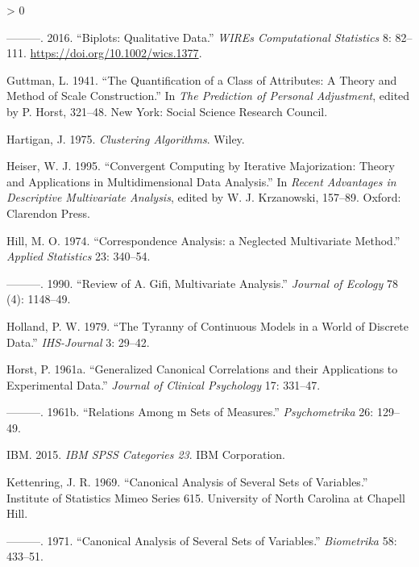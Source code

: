 \documentclass[
  12pt,
]{book}
\newlength{\cslhangindent}
\newenvironment{CSLReferences}[2] %
 {%
  \setlength{\parindent}{0pt}
  \ifodd #1 \everypar{\setlength{\hangindent}{\cslhangindent}}\ignorespaces\fi
  \ifnum #2 > 0
  \setlength{\parskip}{#2\baselineskip}
  \fi
 }%
 {}
\begin{document}
\begin{CSLReferences}{1}{0}
\leavevmode\hypertarget{ref-gower_leroux_gardnerlubbe_16}{}%
---------. 2016. {``{Biplots: Qualitative Data}.''} \emph{WIREs Computational Statistics} 8: 82--111. \url{https://doi.org/10.1002/wics.1377}.

\leavevmode\hypertarget{ref-guttman_41}{}%
Guttman, L. 1941. {``{The Quantification of a Class of Attributes: A Theory and Method of Scale Construction}.''} In \emph{The Prediction of Personal Adjustment}, edited by P. Horst, 321--48. New York: Social Science Research Council.

\leavevmode\hypertarget{ref-hartigan_75}{}%
Hartigan, J. 1975. \emph{Clustering Algorithms}. Wiley.

\leavevmode\hypertarget{ref-heiser_95}{}%
Heiser, W. J. 1995. {``{Convergent Computing by Iterative Majorization: Theory and Applications in Multidimensional Data Analysis}.''} In \emph{Recent Advantages in Descriptive Multivariate Analysis}, edited by W. J. Krzanowski, 157--89. Oxford: Clarendon Press.

\leavevmode\hypertarget{ref-hill_74}{}%
Hill, M. O. 1974. {``{Correspondence Analysis: a Neglected Multivariate Method}.''} \emph{Applied Statistics} 23: 340--54.

\leavevmode\hypertarget{ref-hill_90}{}%
---------. 1990. {``{Review of A. Gifi, Multivariate Analysis}.''} \emph{Journal of Ecology} 78 (4): 1148--49.

\leavevmode\hypertarget{ref-holland_79}{}%
Holland, P. W. 1979. {``{The Tyranny of Continuous Models in a World of Discrete Data}.''} \emph{IHS-Journal} 3: 29--42.

\leavevmode\hypertarget{ref-horst_61b}{}%
Horst, P. 1961a. {``{Generalized Canonical Correlations and their Applications to Experimental Data}.''} \emph{Journal of Clinical Psychology} 17: 331--47.

\leavevmode\hypertarget{ref-horst_61a}{}%
---------. 1961b. {``{Relations Among m Sets of Measures}.''} \emph{Psychometrika} 26: 129--49.

\leavevmode\hypertarget{ref-ibm_15}{}%
IBM. 2015. \emph{IBM SPSS Categories 23}. IBM Corporation.

\leavevmode\hypertarget{ref-kettenring_69}{}%
Kettenring, J. R. 1969. {``{Canonical Analysis of Several Sets of Variables}.''} Institute of Statistics Mimeo Series 615. University of North Carolina at Chapell Hill.

\leavevmode\hypertarget{ref-kettenring_71}{}%
---------. 1971. {``{Canonical Analysis of Several Sets of Variables}.''} \emph{Biometrika} 58: 433--51.


\end{CSLReferences}
\end{document}

